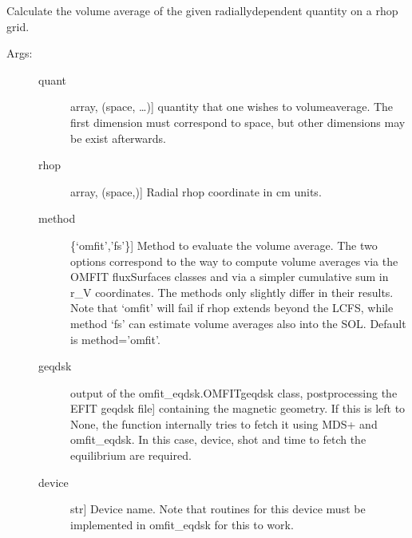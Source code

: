 \documentclass[letterpaper,10pt,english]{sphinxmanual}
\begin{document}
\begin{fulllineitems}
\label{\detokenize{aurora:aurora.coords.vol_average}}
Calculate the volume average of the given radially\sphinxhyphen{}dependent quantity on a rhop grid.
\begin{description}
\item[{Args:}] \leavevmode\begin{description}
\item[{quant}] \leavevmode{[}array, (space, …){]}
quantity that one wishes to volume\sphinxhyphen{}average. The first dimension must correspond to space,
but other dimensions may be exist afterwards.

\item[{rhop}] \leavevmode{[}array, (space,){]}
Radial rhop coordinate in cm units.

\item[{method}] \leavevmode{[}\{‘omfit’,’fs’\}{]}
Method to evaluate the volume average. The two options correspond to the way to compute
volume averages via the OMFIT fluxSurfaces classes and via a simpler cumulative sum in r\_V 
coordinates. The methods only slightly differ in their results. Note that ‘omfit’ will fail if 
rhop extends beyond the LCFS, while method ‘fs’ can estimate volume averages also into the SOL.
Default is method=’omfit’.

\item[{geqdsk}] \leavevmode{[}output of the omfit\_eqdsk.OMFITgeqdsk class, postprocessing the EFIT geqdsk file{]}
containing the magnetic geometry. If this is left to None, the function internally tries to fetch
it using MDS+ and omfit\_eqdsk. In this case, device, shot and time to fetch the equilibrium 
are required.

\item[{device}] \leavevmode{[}str{]}
Device name. Note that routines for this device must be implemented in omfit\_eqdsk for this 
to work.


\end{description}
\end{description}
\end{fulllineitems}
\end{document}
